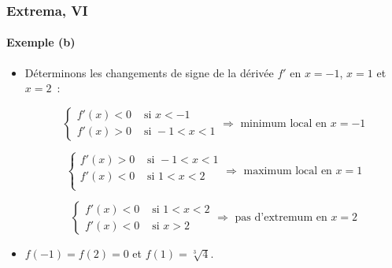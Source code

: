 \documentclass[10pt,notheorems]{beamer}
\theoremstyle{plain}
\theoremstyle{definition} %
\begin{document}
\begin{frame}
  \frametitle{Extrema, VI}
  \framesubtitle{Exemple (b)}

  \medskip

  \begin{itemize}

  \item Déterminons les changements de signe de la dérivée $f'$ en $x=-1$, $x=1$ et $x=2$~:

    \[
      \begin{cases}
        f'(x)<0 &\text{ si }x<-1\\
        f'(x)>0 &\text{ si }-1<x<1
      \end{cases}
      \Rightarrow
      \text{ minimum local en }x=-1
    \]

    \[
      \begin{cases}
        f'(x)>0 &\text{ si }-1<x<1\\
        f'(x)<0 &\text{ si }1<x<2\\
      \end{cases}
      \Rightarrow
      \text{ maximum local en }x=1
    \]

    \bigskip

    \[
      \begin{cases}
        f'(x)<0 &\text{ si }1<x<2\\
        f'(x)<0 &\text{ si }x>2
      \end{cases}
      \Rightarrow
      \text{ pas d'extremum en }x=2
    \]

    \bigskip

  \item $f(-1) = f(2) = 0$ et $f(1) = \sqrt[3]{4}$.

  \end{itemize}

\end{frame}
\end{document}
